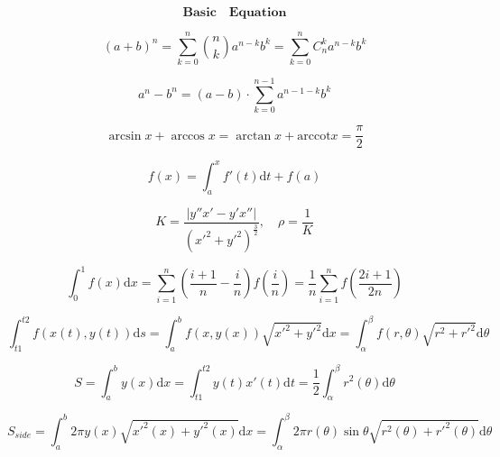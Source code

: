 \documentclass{article}
\begin{document}
\begin{displaymath}
    \mathbf{Basic \quad Equation}
\end{displaymath}

\begin{displaymath}
    (a+b)^n = \sum_{k=0}^{n}\binom{n}{k}a^{n-k}b^{k} = \sum_{k=0}^n{C_{n}^{k}a^{n-k}b^k}
\end{displaymath}

\begin{displaymath}
    a^{n}-b^{n} = (a-b) \cdot \sum_{k=0}^{n-1}a^{n-1-k}b^{k}
\end{displaymath}

\begin{displaymath}
    \arcsin x + \arccos x = \arctan x + \mathrm{arccot}x = \frac{\pi}{2} 
\end{displaymath}

\begin{displaymath}
    f(x) = \int_{a}^{x}f'(t) \mathrm{d}t + f(a)
\end{displaymath}

\begin{displaymath}
    K = \frac{|y''x'-y'x''|}{(x'^{2}+y'^{2})^{\frac{3}{2}}}, \quad \rho = \frac{1}{K}
\end{displaymath}

\begin{displaymath}
    \int_{0}^{1} f(x) \mathrm{d}x = \sum_{i=1}^{n}\left(\frac{i+1}{n}-\frac{i}{n}\right)f\left(\frac{i}{n}\right) = \frac{1}{n}\sum_{i=1}^{n}f\left(\frac{2i+1}{2n}\right)
\end{displaymath} 

\begin{displaymath}
    \int_{t1}^{t2} f(x(t),y(t)) \mathrm{d}s = \int_{a}^{b} f(x,y(x)) \sqrt{x'^2+y'^2} \mathrm{d}x = \int_{\alpha}^{\beta} f(r,\theta)\sqrt{r^2 + r'^2} \mathrm{d}\theta
\end{displaymath}

\begin{displaymath}
    S = \int_{a}^{b}y(x)\mathrm{d}x = \int_{t1}^{t2}y(t)x'(t)\mathrm{d}t = \frac{1}{2}\int_{\alpha}^{\beta}{r^2(\theta)}\mathrm{d}\theta 
\end{displaymath}

\begin{displaymath}
    S_{side} = \int_{a}^{b}2 \pi y(x)\sqrt{x'^2(x)+y'^2(x)} \mathrm{d}x = \int_{\alpha}^{\beta}{2\pi r(\theta)\sin \theta \sqrt{r^2(\theta)+r'^2(\theta)}} \mathrm{d}\theta 
\end{displaymath}
\end{document}
